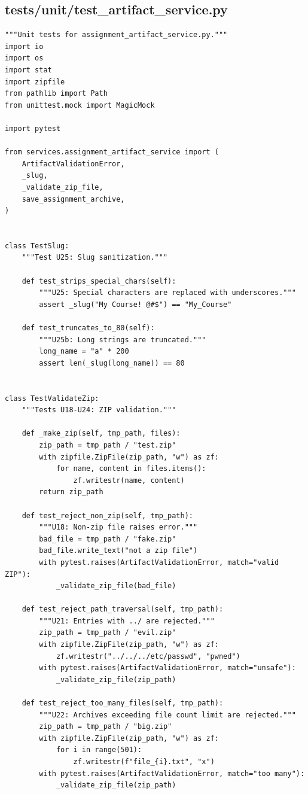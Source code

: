 \documentclass[12pt, letterpaper]{article}
\begin{document}
\subsection{tests/unit/test\_artifact\_service.py}

\begin{lstlisting}[style=pythonstyle]
"""Unit tests for assignment_artifact_service.py."""
import io
import os
import stat
import zipfile
from pathlib import Path
from unittest.mock import MagicMock

import pytest

from services.assignment_artifact_service import (
    ArtifactValidationError,
    _slug,
    _validate_zip_file,
    save_assignment_archive,
)


class TestSlug:
    """Test U25: Slug sanitization."""

    def test_strips_special_chars(self):
        """U25: Special characters are replaced with underscores."""
        assert _slug("My Course! @#$") == "My_Course"

    def test_truncates_to_80(self):
        """U25b: Long strings are truncated."""
        long_name = "a" * 200
        assert len(_slug(long_name)) == 80


class TestValidateZip:
    """Tests U18-U24: ZIP validation."""

    def _make_zip(self, tmp_path, files):
        zip_path = tmp_path / "test.zip"
        with zipfile.ZipFile(zip_path, "w") as zf:
            for name, content in files.items():
                zf.writestr(name, content)
        return zip_path

    def test_reject_non_zip(self, tmp_path):
        """U18: Non-zip file raises error."""
        bad_file = tmp_path / "fake.zip"
        bad_file.write_text("not a zip file")
        with pytest.raises(ArtifactValidationError, match="valid ZIP"):
            _validate_zip_file(bad_file)

    def test_reject_path_traversal(self, tmp_path):
        """U21: Entries with ../ are rejected."""
        zip_path = tmp_path / "evil.zip"
        with zipfile.ZipFile(zip_path, "w") as zf:
            zf.writestr("../../../etc/passwd", "pwned")
        with pytest.raises(ArtifactValidationError, match="unsafe"):
            _validate_zip_file(zip_path)

    def test_reject_too_many_files(self, tmp_path):
        """U22: Archives exceeding file count limit are rejected."""
        zip_path = tmp_path / "big.zip"
        with zipfile.ZipFile(zip_path, "w") as zf:
            for i in range(501):
                zf.writestr(f"file_{i}.txt", "x")
        with pytest.raises(ArtifactValidationError, match="too many"):
            _validate_zip_file(zip_path)


\end{lstlisting}
\end{document}
